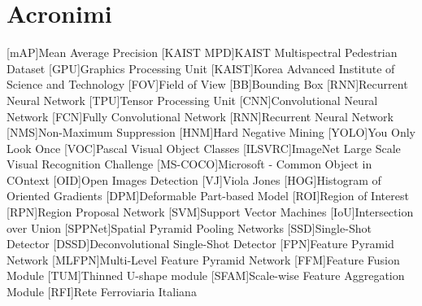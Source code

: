 \chapter*{Acronimi}
\begin{acronym}[CAGD]
    [mAP]{Mean Average Precision}
    [KAIST MPD]{KAIST Multispectral Pedestrian Dataset}
    [GPU]{Graphics Processing Unit}
    [KAIST]{Korea Advanced Institute of Science and Technology}
    [FOV]{Field of View}
    [BB]{Bounding Box}
    [RNN]{Recurrent Neural Network}
    [TPU]{Tensor Processing Unit}
    [CNN]{Convolutional Neural Network}
    [FCN]{Fully Convolutional Network}
    [RNN]{Recurrent Neural Network}
    [NMS]{Non-Maximum Suppression}
    [HNM]{Hard Negative Mining}
    [YOLO]{You Only Look Once}
    [VOC]{Pascal Visual Object Classes}
    [ILSVRC]{ImageNet Large Scale Visual Recognition Challenge}
    [MS-COCO]{Microsoft - Common Object in COntext}
    [OID]{Open Images Detection}
    [VJ]{Viola Jones}
    [HOG]{Histogram of Oriented Gradients}
    [DPM]{Deformable Part-based Model}
    [ROI]{Region of Interest}
    [RPN]{Region Proposal Network}
    [SVM]{Support Vector Machines}
    [IoU]{Intersection over Union}
    [SPPNet]{Spatial Pyramid Pooling Networks}
    [SSD]{Single-Shot Detector}
    [DSSD]{Deconvolutional Single-Shot Detector}
    [FPN]{Feature Pyramid Network}
    [MLFPN]{Multi-Level Feature Pyramid Network}
    [FFM]{Feature Fusion Module}
    [TUM]{Thinned U-shape module}
    [SFAM]{Scale-wise Feature Aggregation Module}
    [RFI]{Rete Ferroviaria Italiana}
\end{acronym}